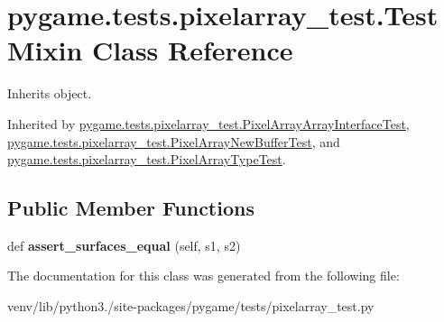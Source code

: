 \hypertarget{classpygame_1_1tests_1_1pixelarray__test_1_1_test_mixin}{}\section{pygame.\+tests.\+pixelarray\+\_\+test.\+Test\+Mixin Class Reference}
\label{classpygame_1_1tests_1_1pixelarray__test_1_1_test_mixin}


Inherits object.



Inherited by \hyperlink{classpygame_1_1tests_1_1pixelarray__test_1_1_pixel_array_array_interface_test}{pygame.\+tests.\+pixelarray\+\_\+test.\+Pixel\+Array\+Array\+Interface\+Test}, \hyperlink{classpygame_1_1tests_1_1pixelarray__test_1_1_pixel_array_new_buffer_test}{pygame.\+tests.\+pixelarray\+\_\+test.\+Pixel\+Array\+New\+Buffer\+Test}, and \hyperlink{classpygame_1_1tests_1_1pixelarray__test_1_1_pixel_array_type_test}{pygame.\+tests.\+pixelarray\+\_\+test.\+Pixel\+Array\+Type\+Test}.

\subsection*{Public Member Functions}
\begin{DoxyCompactItemize}
\item 
\mbox{\label{classpygame_1_1tests_1_1pixelarray__test_1_1_test_mixin_a430bad72f45413bd807b64e1ece3a8fe}} 
def {\bfseries assert\+\_\+surfaces\+\_\+equal} (self, s1, s2)
\end{DoxyCompactItemize}


The documentation for this class was generated from the following file\+:\begin{DoxyCompactItemize}
\item 
venv/lib/python3./site-\/packages/pygame/tests/pixelarray\+\_\+test.\+py\end{DoxyCompactItemize}
